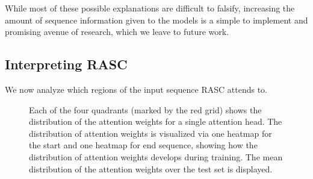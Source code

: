 \begin{itemize}
\end{itemize}

While most of these possible explanations are difficult to falsify, increasing the amount of sequence information given to the models is a simple to implement and promising avenue of research, which we leave to future work. 



\subsection{Interpreting RASC} \label{subsubsec:attn_interpretation}
We now analyze which regions of the input sequence RASC attends to. 

\begin{figure}
	\centering
	
	\caption{Each of the four quadrants (marked by the red grid) shows the distribution of the attention weights for a single attention head. The distribution of attention weights is visualized via one heatmap for the start and one heatmap for end sequence, showing how the distribution of attention weights develops during training. The mean distribution of the attention weights over the test set is displayed.}
	\label{fig:attn_heatmap}
	
	
\end{figure}

